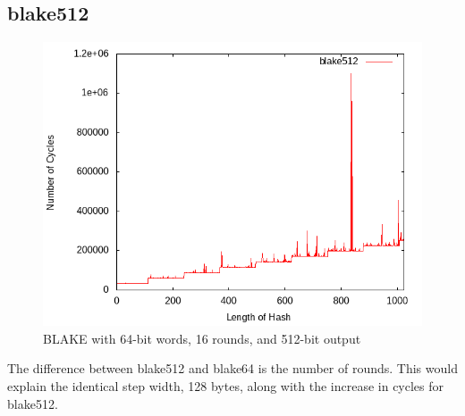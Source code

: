 \documentclass[10pt,a4paper]{article}
\begin{document}
\subsection{blake512}
    \begin{figure}[H]
        \begin{center}
            \includegraphics[scale=0.5]{images/blake512.png} 
            \caption{BLAKE with 64-bit words, 16 rounds, and 512-bit output}
        \end{center}
    \end{figure}
The difference between blake512 and blake64 is the number of rounds. This would explain the identical step width, 128 bytes, along with the increase
in cycles for blake512. 
\end{document}
